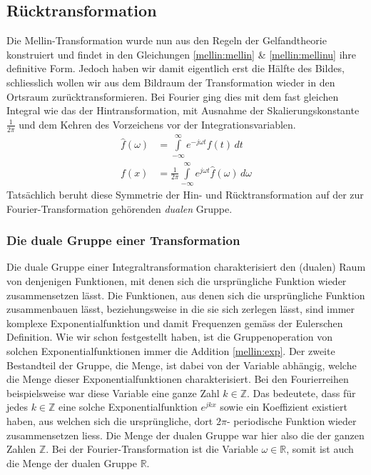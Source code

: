 \subsection{Rücktransformation
\label{mellin:subsection:ruecktransformation}}
Die Mellin-Transformation wurde nun aus den Regeln der Gelfandtheorie 
konstruiert und findet in den Gleichungen \eqref{mellin:mellin} \& 
\eqref{mellin:mellinu} ihre definitive Form.
Jedoch haben wir damit eigentlich erst die Hälfte des Bildes, schliesslich 
wollen wir aus dem Bildraum der Transformation wieder in den Ortsraum 
zurücktransformieren. 
Bei Fourier ging dies mit dem fast gleichen Integral wie das der 
Hintransformation, mit Ausnahme der Skalierungskonstante $\frac{1}{2\pi}$
und dem Kehren des Vorzeichens vor der Integrationsvariablen.
\begin{align*}
    \hat{f}(\omega) &= \int\limits_{-\infty}^{\infty} 
    e^{-j\omega{}t} f(t) \,{d}t \\
    f(x) &= \frac{1}{2\pi} \int\limits_{-\infty}^{\infty} 
    e^{j\omega t} \hat{f}(\omega) \,{d}\omega
\end{align*}
Tatsächlich beruht diese Symmetrie der Hin- und Rücktransformation auf der 
zur Fourier-Transformation gehörenden {\em dualen} Gruppe.
\subsubsection{Die duale Gruppe einer Transformation}
Die duale Gruppe einer Integraltransformation charakterisiert den 
(dualen) Raum von denjenigen Funktionen, mit denen sich die 
ursprüngliche Funktion wieder zusammensetzen lässt.
Die Funktionen, aus denen sich die ursprüngliche Funktion zusammenbauen 
lässt, beziehungsweise in die sie sich zerlegen lässt, 
sind immer komplexe Exponentialfunktion und damit Frequenzen gemäss 
der Eulerschen Definition.
Wie wir schon festgestellt haben, ist die Gruppenoperation von solchen 
Exponentialfunktionen immer die Addition \eqref{mellin:exp}.
Der zweite Bestandteil der Gruppe, die Menge, ist dabei von der Variable 
abhängig, welche die Menge dieser Exponentialfunktionen charakterisiert.
Bei den Fourierreihen beispielsweise war diese Variable eine ganze
Zahl $k \in \mathbb{Z}$.
Das bedeutete, dass für jedes $k \in \mathbb{Z}$ eine solche 
Exponentialfunktion $e^{jkx}$ sowie ein Koeffizient existiert haben, aus 
welchen sich die ursprüngliche, dort $2\pi$- periodische Funktion wieder 
zusammensetzen liess.
Die Menge der dualen Gruppe war hier also die der ganzen Zahlen 
$\mathbb{Z}$. 
Bei der Fourier-Transformation ist die Variable $\omega \in \mathbb{R}$, 
somit ist auch die Menge der dualen Gruppe $\mathbb{R}$.


